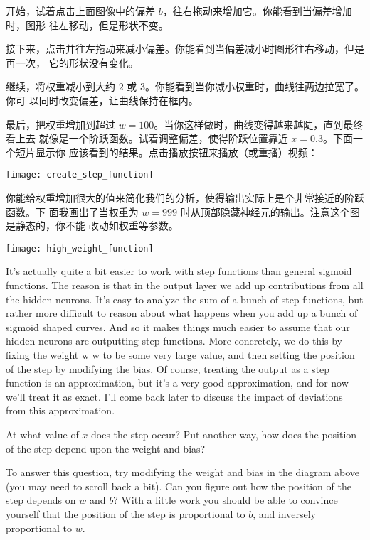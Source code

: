 开始，试着点击上面图像中的偏差 $b$，往右拖动来增加它。你能看到当偏差增加时，图形
往左移动，但是形状不变。

接下来，点击并往左拖动来减小偏差。你能看到当偏差减小时图形往右移动，但是再一次，
它的形状没有变化。

继续，将权重减小到大约 $2$ 或 $3$。你能看到当你减小权重时，曲线往两边拉宽了。你可
以同时改变偏差，让曲线保持在框内。

最后，把权重增加到超过 $w = 100$。当你这样做时，曲线变得越来越陡，直到最终看上去
就像是一个阶跃函数。试着调整偏差，使得阶跃位置靠近 $x = 0.3$。下面一个短片显示你
应该看到的结果。点击播放按钮来播放（或重播）视频：
\begin{center}
  \texttt{[image: create\_step\_function]}
\end{center}


你能给权重增加很大的值来简化我们的分析，使得输出实际上是个非常接近的阶跃函数。下
面我画出了当权重为 $w = 999$ 时从顶部隐藏神经元的输出。注意这个图是静态的，你不能
改动如权重等参数。
\begin{center}
  \texttt{[image: high\_weight\_function]}
\end{center}

It's actually quite a bit easier to work with step functions than general
sigmoid functions. The reason is that in the output layer we add up
contributions from all the hidden neurons. It's easy to analyze the sum of a
bunch of step functions, but rather more difficult to reason about what happens
when you add up a bunch of sigmoid shaped curves. And so it makes things much
easier to assume that our hidden neurons are outputting step functions. More
concretely, we do this by fixing the weight w w to be some very large value, and
then setting the position of the step by modifying the bias. Of course, treating
the output as a step function is an approximation, but it's a very good
approximation, and for now we'll treat it as exact. I'll come back later to
discuss the impact of deviations from this approximation.

At what value of $x$ does the step occur? Put another way, how does the position
of the step depend upon the weight and bias?

To answer this question, try modifying the weight and bias in the diagram above
(you may need to scroll back a bit). Can you figure out how the position of the
step depends on $w$ and $b$? With a little work you should be able to convince
yourself that the position of the step is proportional to $b$, and inversely
proportional to $w$.

